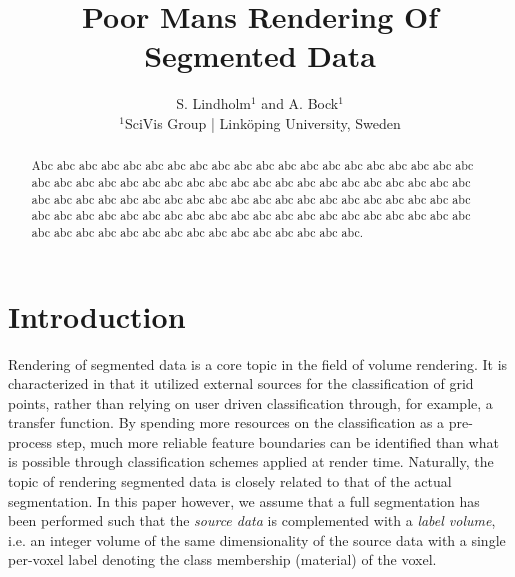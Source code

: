 \documentclass{egpubl}
\title[PMS]%
      {Poor Mans Rendering Of Segmented Data}
\author[S. Lindholm \& A. Bock]
       {S. Lindholm$^{1}$
        and A. Bock$^{1}$
        \\
         $^1$SciVis Group | Link\"{o}ping University, Sweden
       }
\begin{document}

\maketitle

\begin{abstract}
   Abc abc abc abc abc abc abc abc abc abc abc abc abc abc abc abc abc abc abc abc abc abc abc abc abc abc abc abc abc abc abc abc abc abc abc abc abc abc abc abc abc abc abc abc abc abc abc abc abc abc abc abc abc abc abc abc abc abc abc abc abc abc abc abc abc abc abc abc abc abc abc abc abc abc abc abc abc abc abc abc abc abc abc abc abc abc abc abc abc abc abc abc abc abc abc.

\begin{classification} %
\end{classification}

\end{abstract}





\section{Introduction}

Rendering of segmented data is a core topic in the field of volume rendering. It is characterized in that it utilized external sources for the classification of grid points, rather than relying on user driven classification through, for example, a transfer function. By spending more resources on the classification as a pre-process step, much more reliable feature boundaries can be identified than what is possible through classification schemes applied at render time. Naturally, the topic of rendering segmented data is closely related to that of the actual segmentation. In this paper however, we assume that a full segmentation has been performed such that the \emph{source data} is complemented with a \emph{label volume}, i.e. an integer volume of the same dimensionality of the source data with a single per-voxel label denoting the class membership (material) of the voxel.
\end{document}
